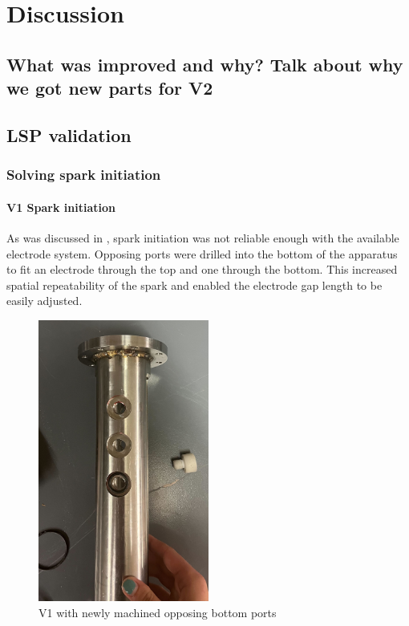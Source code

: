 \chapter{Discussion}

\section*{What was improved and why? Talk about why we got new parts for V2}

\section{LSP validation}

    \subsection{Solving spark initiation}

        \subsubsection{V1 Spark initiation}
            
            As was discussed in \textcite{duplayArgonLaserPlasmaThruster2024a}, spark initiation was not reliable enough with the available electrode system. Opposing ports were drilled into the bottom of the apparatus to fit an electrode through the top and one through the bottom. This increased spatial repeatability of the spark and enabled the electrode gap length to be easily adjusted.

            \begin{figure}[!ht]
                \centering
                \includegraphics[width=0.5\textwidth]{assets/5 discussion/Bottom ports machined.jpg}
                \caption{V1 with newly machined opposing bottom ports}
            \end{figure}

